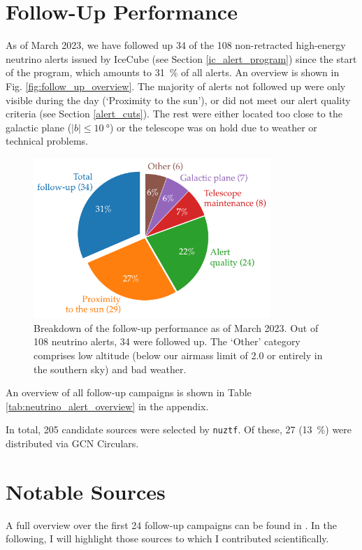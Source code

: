 \documentclass[
    a4paper, %
    fontsize=10pt, %
    twoside=true, %
    numbers=noenddot, %
    fontmethod=tex,
]{kaobook}
\begin{document}
\section{Follow-Up Performance}
As of March 2023, we have followed up 34 of the 108 non-retracted high-energy neutrino alerts issued by IceCube (see Section \ref{ic_alert_program}) since the start of the program, which amounts to \SI{31}{\percent} of all alerts. An overview is shown in Fig. \ref{fig:follow_up_overview}. The majority of alerts not followed up were only visible during the day (`Proximity to the sun'), or did not meet our alert quality criteria (see Section \ref{alert_cuts}). The rest were either located too close to the galactic plane ($|b|\leq\SI{10}{\degree}$) or the telescope was on hold due to weather or technical problems.

\begin{figure}[h!]
    \includegraphics[width=0.8\textwidth]{fu/follow_up_overview.pdf}
    \caption[Follow-up performance]{Breakdown of the follow-up performance as of March 2023. Out of 108 neutrino alerts, 34 were followed up. The `Other' category comprises low altitude (below our airmass limit of 2.0 or entirely in the southern sky) and bad weather.}
\end{figure}

An overview of all follow-up campaigns is shown in Table \ref{tab:neutrino_alert_overview} in the appendix.

In total, 205 candidate sources were selected by \texttt{nuztf}. Of these, 27 (\SI{13}{\percent}) were distributed via GCN Circulars.

\section{Notable Sources}
A full overview over the first 24 follow-up campaigns can be found in . In the following, I will highlight those sources to which I contributed scientifically.
\end{document}
